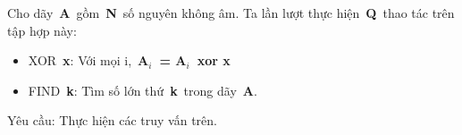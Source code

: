 Cho dãy \textbf{A} gồm \textbf{N} số nguyên không âm. Ta lần lượt thực hiện \textbf{Q} thao tác trên tập hợp này:
\begin{itemize}
	\item XOR \textbf{x}: Với mọi i, \textbf{A$_i$ = A$_i$ xor x}
	\item FIND \textbf{k}: Tìm số lớn thứ \textbf{k} trong dãy \textbf{A}.
\end{itemize}

Yêu cầu: Thực hiện các truy vấn trên.